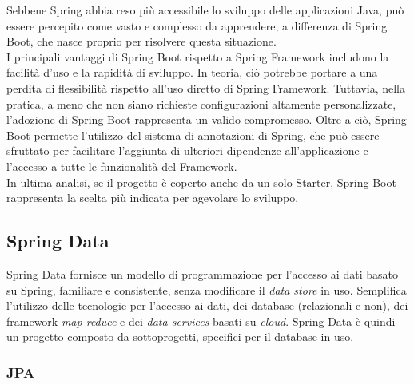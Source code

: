 Sebbene Spring abbia reso più accessibile lo sviluppo delle applicazioni Java, può essere percepito come vasto e complesso da apprendere, a differenza di Spring Boot, che nasce proprio per risolvere questa situazione.\\
I principali vantaggi di Spring Boot rispetto a Spring Framework includono la facilità d'uso e la rapidità di sviluppo. In teoria, ciò potrebbe portare a una perdita di flessibilità rispetto all'uso diretto di Spring Framework. Tuttavia, nella pratica, a meno che non siano richieste configurazioni altamente personalizzate, l'adozione di Spring Boot rappresenta un valido compromesso.
Oltre a ciò, Spring Boot permette l’utilizzo del sistema di annotazioni di Spring, che può essere sfruttato per facilitare l'aggiunta di ulteriori dipendenze all'applicazione e l'accesso a tutte le funzionalità del Framework.\\
In ultima analisi, se il progetto è coperto anche da un solo Starter, Spring Boot rappresenta la scelta più indicata per agevolare lo sviluppo.\cite{SPRINGBOOT_techwithmaddy}\cite{SPRINGBOOT_ibm}

\subsection{Spring Data}
Spring Data fornisce un modello di programmazione per l'accesso ai dati basato su Spring, familiare e consistente, senza modificare il \textit{data store} in uso.
Semplifica l’utilizzo delle tecnologie per l'accesso ai dati, dei database (relazionali e non), dei framework \textit{map-reduce} e dei \textit{data services} basati su \textit{cloud}. Spring Data è quindi un progetto composto da sottoprogetti, specifici per il database in uso.\cite{SPRINGDATA_spring}

\subsubsection{JPA}

